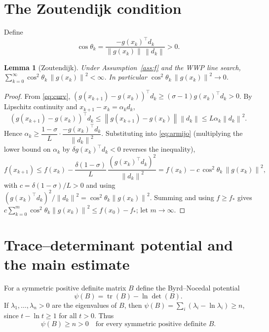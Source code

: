 \documentclass{amsart}
\newtheorem{lemma}{Lemma}
\theoremstyle{definition}
\DeclareMathOperator{\tr}{tr}
\newcommand{\norm}[1]{\left\lVert #1\right\rVert}
\begin{document}
\section{The Zoutendijk condition}

Define
\[
   \cos\theta_k=\frac{-g(x_k)^\top d_k}{\norm{g(x_k)}\,\norm{d_k}}>0 .
\]

\begin{lemma}[Zoutendijk]\label{lem:zoutendijk}
Under Assumption~\ref{ass:f} and the WWP line search,
$\sum_{k=0}^\infty\cos^2\theta_k\,\norm{g(x_k)}^2<\infty$. In particular
$\cos^2\theta_k\,\norm{g(x_k)}^2\to0$.
\end{lemma}

\begin{proof}
From \eqref{eq:curv},
$(g(x_{k+1})-g(x_k))^\top d_k\ge(\sigma-1)g(x_k)^\top d_k>0$. By Lipschitz
continuity and $x_{k+1}-x_k=\alpha_k d_k$,
\[
   (g(x_{k+1})-g(x_k))^\top d_k\le\norm{g(x_{k+1})-g(x_k)}\norm{d_k}
   \le L\alpha_k\norm{d_k}^2 .
\]
Hence $\alpha_k\ge\dfrac{1-\sigma}{L}\cdot\dfrac{-g(x_k)^\top d_k}{\norm{d_k}^2}$.
Substituting into \eqref{eq:armijo} (multiplying the lower bound on $\alpha_k$ by
$\delta g(x_k)^\top d_k<0$ reverses the inequality),
\[
   f(x_{k+1})\le f(x_k)-\frac{\delta(1-\sigma)}{L}\,
   \frac{(g(x_k)^\top d_k)^2}{\norm{d_k}^2}
   = f(x_k)-c\,\cos^2\theta_k\,\norm{g(x_k)}^2,
\]
with $c=\delta(1-\sigma)/L>0$ and using
$(g(x_k)^\top d_k)^2/\norm{d_k}^2=\cos^2\theta_k\norm{g(x_k)}^2$. Summing and
using $f\ge f_*$ gives
$c\sum_{k=0}^m\cos^2\theta_k\norm{g(x_k)}^2\le f(x_0)-f_*$; let $m\to\infty$.
\end{proof}

\section{Trace--determinant potential and the main estimate}

For a symmetric positive definite matrix $B$ define the Byrd--Nocedal potential
\begin{equation}\label{eq:psi}
   \psi(B)=\tr(B)-\ln\det(B).
\end{equation}
If $\lambda_1,\dots,\lambda_n>0$ are the eigenvalues of $B$, then
$\psi(B)=\sum_{i}(\lambda_i-\ln\lambda_i)\ge n$, since $t-\ln t\ge1$ for all
$t>0$. Thus
\begin{equation}\label{eq:psi-pos}
   \psi(B)\ge n>0 \quad\text{for every symmetric positive definite }B.
\end{equation}
\end{document}
